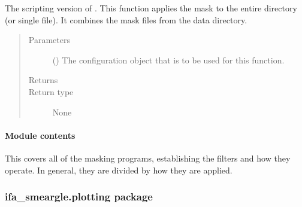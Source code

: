 \documentclass[letterpaper,10pt,english]{sphinxmanual}
\begin{document}

\begin{fulllineitems}
\label{\detokenize{docstrings/ifa_smeargle.masking.scripting:ifa_smeargle.masking.scripting.script_synthesize_masks}}
The scripting version of . This function
applies the mask to the entire directory (or single file). It
combines the mask files from the data directory.
\begin{quote}\begin{description}
\item[{Parameters}] \leavevmode
{} () \textendash{} The configuration object that is to be used for this
function.

\item[{Returns}] \leavevmode


\item[{Return type}] \leavevmode
None

\end{description}\end{quote}

\end{fulllineitems}



\paragraph{Module contents}
\label{\detokenize{docstrings/ifa_smeargle.masking:module-ifa_smeargle.masking}}\label{\detokenize{docstrings/ifa_smeargle.masking:module-contents}}
This covers all of the masking programs, establishing the filters
and how they operate. In general, they are divided by how they
are applied.


\subsubsection{ifa\_smeargle.plotting package}
\label{\detokenize{docstrings/ifa_smeargle.plotting:ifa-smeargle-plotting-package}}\label{\detokenize{docstrings/ifa_smeargle.plotting::doc}}
\end{document}
